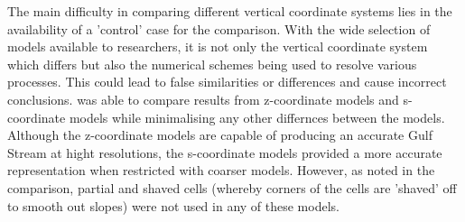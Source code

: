 \documentclass[..\EOYR.tex]{subfiles}
\begin{document}
The main difficulty in comparing different vertical coordinate systems lies in the availability of a 'control' case for the comparison. With the wide selection of models available to researchers, it is not only the vertical coordinate system which differs but also the numerical schemes being used to resolve various processes. This could lead to false similarities or differences and cause incorrect conclusions. \citep{Ezer2016b} was able to compare results from z-coordinate models and s-coordinate models while minimalising any other differnces between the models. Although the z-coordinate models are capable of producing an accurate Gulf Stream at hight resolutions, the s-coordinate models provided a more accurate representation when restricted with coarser models. However, as \citep{Ezer2016b} noted in the comparison, partial and shaved cells (whereby corners of the cells are 'shaved' off to smooth out slopes) were not used in any of these models.
\end{document}
